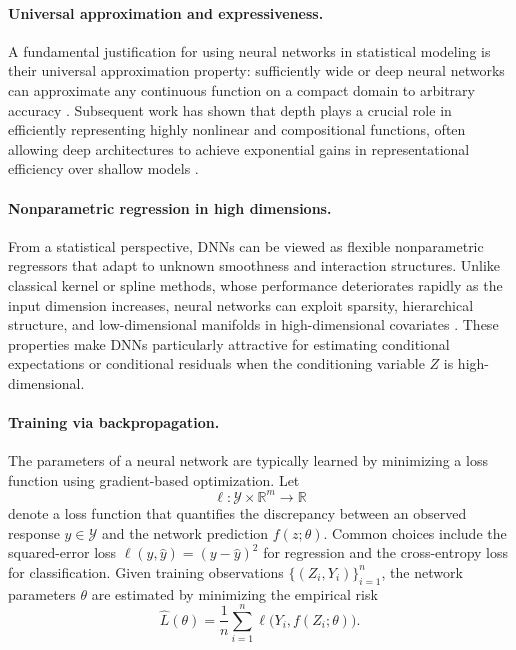 \documentclass[12pt,reqno,oneside]{amsbook}
\theoremstyle{definition}
\theoremstyle{remark}
\begin{document}
\paragraph{Universal approximation and expressiveness.}
A fundamental justification for using neural networks in statistical modeling
is their universal approximation property: sufficiently wide or deep neural
networks can approximate any continuous function on a compact domain to
arbitrary accuracy \cite{Hornik1989,Cybenko1989}. Subsequent work has shown that
depth plays a crucial role in efficiently representing highly nonlinear and
compositional functions, often allowing deep architectures to achieve
exponential gains in representational efficiency over shallow models
\cite{Montufar2014}.

\paragraph{Nonparametric regression in high dimensions.}
From a statistical perspective, DNNs can be viewed as flexible nonparametric
regressors that adapt to unknown smoothness and interaction structures. Unlike
classical kernel or spline methods, whose performance deteriorates rapidly as
the input dimension increases, neural networks can exploit sparsity,
hierarchical structure, and low-dimensional manifolds in high-dimensional
covariates \cite{SchmidtHieber2020}. These properties make DNNs particularly
attractive for estimating conditional expectations or conditional residuals
when the conditioning variable $Z$ is high-dimensional.


\paragraph{Training via backpropagation.}
The parameters of a neural network are typically learned by minimizing a loss
function using gradient-based optimization. Let
\[
\ell:\mathcal{Y}\times\mathbb{R}^m\to\mathbb{R}
\]
denote a loss function that quantifies the discrepancy between an observed
response $y\in\mathcal{Y}$ and the network prediction $f(z;\theta)$.
Common choices include the squared-error loss
$\ell(y,\hat y)=(y-\hat y)^2$ for regression and the cross-entropy loss for
classification. Given training observations
$\{(Z_i,Y_i)\}_{i=1}^n$, the network parameters $\theta$ are estimated by
minimizing the empirical risk
\[
\hat L(\theta)
=
\frac{1}{n}\sum_{i=1}^n
\ell\bigl(Y_i,f(Z_i;\theta)\bigr).
\]
\end{document}
